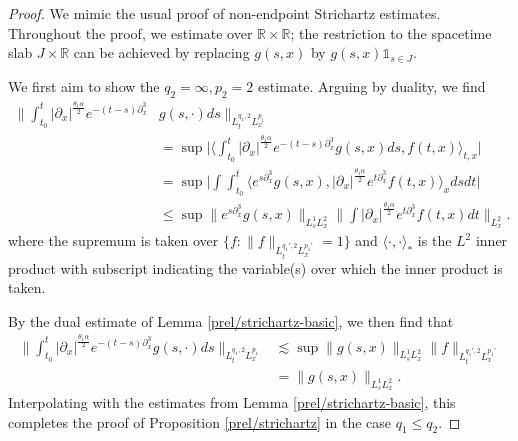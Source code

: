 \documentclass[10pt, reqno]{amsart}
\numberwithin{equation}{section}
\newcommand{\R}{\mathbb{R}}
\theoremstyle{definition}
\theoremstyle{remark}
\begin{document}
\begin{proof}
    We mimic the usual proof of non-endpoint Strichartz estimates. Throughout the proof, we estimate over $\R \times \R$; the restriction to the spacetime slab $J \times \R$ can be achieved by replacing $g(s,x)$ by $g(s,x) \mathds{1}_{s \in J}$.

    We first aim to show the $q_2 = \infty, p_2 = 2$ estimate. Arguing by duality, we find
    \begin{align*}
        \bigg\|\int_{t_0}^t |\partial_x|^\frac{\theta_1\alpha}{2} e^{-(t-s)\partial_x^3}&  g(s,\cdot) ds\bigg\|_{L_t^{q_1,2}L_x^{p_1}} \\
        & = \sup\bigg|\bigg\langle\int_{t_0}^t |\partial_x|^\frac{\theta_1\alpha}{2} e^{-(t-s)\partial_x^3} g(s,x) ds,  f(t,x)\bigg\rangle_{t,x}\bigg| \\
        & = \sup\bigg|\int \int_{t_0}^t\Big\langle  e^{s\partial_x^3} g(s,x),|\partial_x|^\frac{\theta_1\alpha}{2}e^{t\partial_x^3}f(t,x)\Big\rangle_{x}dsdt\bigg| \\
        & \leq \sup\big\|e^{s\partial_x^3} g(s,x)\big\|_{L_s^1L_x^2}\bigg\|\int |\partial_x|^\frac{\theta_1\alpha}{2}e^{t\partial_x^3}f(t,x)dt\bigg\|_{L_x^2}.
    \end{align*}
    where the supremum is taken over $\big\{f : \|f\|_{L_t^{q_1',2}L_x^{p_1'}} = 1\big\}$ and $\langle\cdot,\cdot\rangle_*$ is the $L^2$ inner product with subscript indicating the variable(s) over which the inner product is taken.

    By the dual estimate of Lemma \ref{prel/strichartz-basic}, we then find that
    \begin{align*}
        \bigg\|\int_{t_0}^t |\partial_x|^\frac{\theta_1\alpha}{2} e^{-(t-s)\partial_x^3} g(s,\cdot) ds\bigg\|_{L_t^{q_1,2}L_x^{p_1}}
        & \lesssim \sup\|g(s,x)\|_{L_s^1L_x^2}\|f\|_{L_t^{q_1',2}L_x^{p_1'}}\\
        & = \|g(s,x)\|_{L_s^1 L_x^2}.
    \end{align*}
    Interpolating with the estimates from Lemma \ref{prel/strichartz-basic}, this completes the proof of Proposition \ref{prel/strichartz} in the case $q_1 \leq q_2$.


\end{proof}
\end{document}

